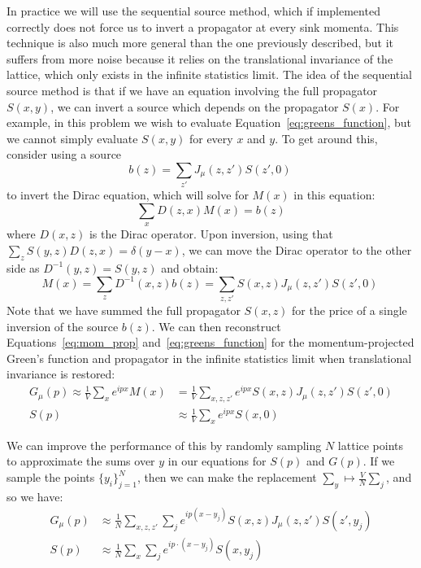 \documentclass[11pt, oneside]{article}   	%
\theoremstyle{definition}
\begin{document}
In practice we will use the sequential source method, which if implemented correctly does not force us to invert a propagator 
at every sink momenta. This technique is also much more general than the one previously described, but it suffers from 
more noise because it relies on the translational invariance of the lattice, which only exists in the infinite statistics 
limit. The idea of the sequential source method is that if we have an equation involving the full propagator $S(x, y)$, we can 
invert a source which depends on the propagator $S(x)$. For example, in this problem we wish to evaluate 
Equation~\ref{eq:greens_function}, but we cannot simply evaluate $S(x, y)$ for every $x$ and $y$. To get around this, 
consider using a source
\begin{equation}
	b(z) = \sum_{z'} J_\mu(z, z') S(z', 0)~
	\label{eq:source}
\end{equation}
to invert the Dirac equation, which will solve for $M(x)$ in this equation:
\begin{equation}
	\sum_x D(z, x) M(x) = b(z)
\end{equation} 
where $D(x, z)$ is the Dirac operator. Upon inversion, using that $\sum_z S(y, z) D(z, x) = \delta(y - x)$, we can move the 
Dirac operator to the other side as $D^{-1}(y, z) = S(y, z)$ and obtain:
\begin{equation}
	M(x) = \sum_z D^{-1}(x, z) b(z) = \sum_{z, z'} S(x, z) J_\mu(z, z') S(z', 0)~
	\label{eq:inversion}
\end{equation}
Note that we have summed the full propagator $S(x, z)$ for the price of a single inversion of the source $b(z)$. We can then 
reconstruct Equations~\ref{eq:mom_prop} and~\ref{eq:greens_function} for the momentum-projected Green's function 
and propagator in the infinite statistics limit when translational invariance is restored:
\begin{align}
	G_\mu(p)\approx \frac{1}{V} \sum_x e^{ipx} M(x) &= \frac{1}{V} \sum_{x, z, z'} e^{ipx} S(x, z) J_\mu(z, z') S(z', 0) \\
		S(p)&\approx\frac{1}{V}\sum_x e^{ipx} S(x, 0)
\end{align}

We can improve the performance of this by randomly sampling $N$ lattice points to approximate the sums over $y$ in 
our equations for $S(p)$ and $G(p)$. If we sample the points $\{y_i\}_{j = 1}^N$, then we can make the replacement 
$\sum_y\mapsto \frac{V}{N}\sum_j$, and so we have:
\begin{align}
	G_\mu(p)&\approx \frac{1}{N}\sum_{x, z, z'}\sum_j e^{ip(x - y_j)} S(x, z) J_\mu(z, z') S(z', y_j) \\
	S(p) &\approx \frac{1}{N} \sum_x\sum_j e^{ip\cdot(x - y_j)} S(x, y_j)
\end{align}
\end{document}

